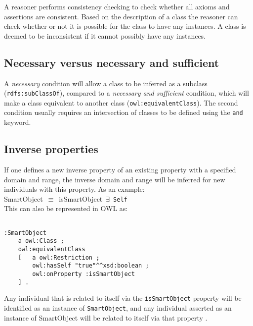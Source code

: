 A reasoner performs consistency checking to check whether all axioms and assertions are consistent. Based on the description of a class the reasoner can check whether or not it is possible for the class to have any instances.  A class is deemed to be inconsistent if it cannot possibly have any instances. %

\subsection{Necessary versus necessary and sufficient}

A \emph{necessary} condition will allow a class to be inferred as a subclass (\texttt{rdfs:subClassOf}), compared to a \emph{necessary and sufficient} condition, which will make a class equivalent to another class (\texttt{owl:equivalent\-Class}). The second condition usually requires an intersection of classes to be defined using the \texttt{and} keyword.


\subsection{Inverse properties}

If one defines a new inverse property of an existing property with a specified domain and range, the inverse domain and range will be inferred for new individuals with this property.  As an example:\\

\noindent
SmartObject~\ensuremath{\equiv}~isSmartObject~\ensuremath{\exists}~\texttt{Self}\\

This can also be represented in \ac{OWL} as:

\begin{verbatim}

:SmartObject
    a owl:Class ;
    owl:equivalentClass
    [   a owl:Restriction ;
        owl:hasSelf "true"^^xsd:boolean ;
        owl:onProperty :isSmartObject
    ] .
\end{verbatim}


Any individual that is related to itself via the \texttt{isSmartObject} property will be identified as an instance of \texttt{SmartObject}, and any individual asserted as an instance of SmartObject will be related to itself via that property \cite{Hoekstra2010}.


